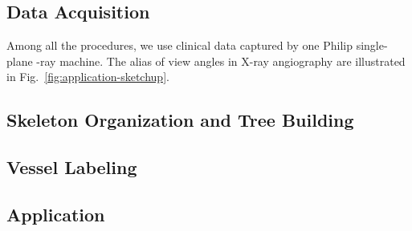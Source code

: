 \documentclass[journal]{IEEEtran}
\begin{document}
\subsection{Data Acquisition}
Among all the procedures, we use clinical data captured by one Philip single-plane -ray machine. The alias of view angles in X-ray angiography are illustrated in Fig.~\ref{fig:application-sketchup}. 


\subsection{Skeleton Organization and Tree Building}





\subsection{Vessel Labeling}





\subsection{Application}



%
%

\end{document}
